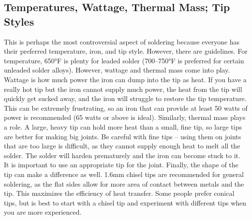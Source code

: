 \subsection{Temperatures, Wattage, Thermal Mass; Tip Styles}
This is perhaps the most controversial aspect of soldering because everyone has their preferred temperature, iron, and tip style. However, there are guidelines. For temperature, 650°F is plenty for leaded solder (700–750°F is preferred for certain unleaded solder alloys). However, wattage and thermal mass come into play. Wattage is how much power the iron can dump into the tip as heat. If you have a really hot tip but the iron cannot supply much power, the heat from the tip will quickly get sucked away, and the iron will struggle to restore the tip temperature. This can be extremely frustrating, so an iron that can provide at least 50 watts of power is recommended (65 watts or above is ideal). Similarly, thermal mass plays a role. A large, heavy tip can hold more heat than a small, fine tip, so large tips are better for making big joints. Be careful with fine tips – using them on joints that are too large is difficult, as they cannot supply enough heat to melt all the solder. The solder will harden prematurely and the iron can become stuck to it. It is important to use an appropriate tip for the joint. Finally, the shape of the tip can make a difference as well. 1.6mm chisel tips are recommended for general soldering, as the flat sides allow for more area of contact between metals and the tip. This maximizes the efficiency of heat transfer. Some people prefer conical tips, but is best to start with a chisel tip and experiment with different tips when you are more experienced.
